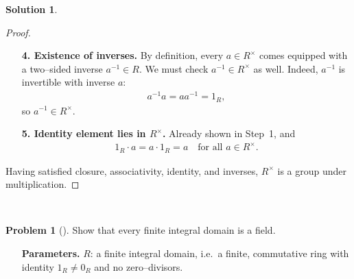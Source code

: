 \documentclass[12pt]{article}
\theoremstyle{definition} %
\newtheorem{solution}{Solution}
\newtheorem{problem}{Problem}
\theoremstyle{plain} %
\begin{document}
\begin{solution}
\begin{proof}
\begin{enumerate}
      \item[\textbf{4. Existence of inverses.}]
            By definition, every $a\in R^{\times}$ comes equipped with a
            two–sided inverse $a^{-1}\in R$.
            We must check $a^{-1}\in R^{\times}$ as well.
            Indeed, $a^{-1}$ is invertible with inverse $a$:
            \begin{align}
                a^{-1}a = aa^{-1} = 1_R,
            \end{align}
            so $a^{-1}\in R^{\times}$.

      \item[\textbf{5. Identity element lies in $R^{\times}$.}]
            Already shown in Step 1, and
            \begin{align}
                1_R\cdot a = a\cdot 1_R = a
                \quad\text{for all } a\in R^{\times}.
            \end{align}
  \end{enumerate}
  Having satisfied closure, associativity, identity, and inverses,
  $R^{\times}$ is a group under multiplication.
\end{proof}
\ 
\end{solution}
\begin{problem}[]
  Show that every finite integral domain is a field.
  \begin{enumerate}
      \item[\textbf{Parameters.}]
            $R$: a finite integral domain, i.e.\ a finite, commutative ring
            with identity $1_R\neq 0_R$ and no zero--divisors.
  \end{enumerate}
\end{problem}
\end{document}
